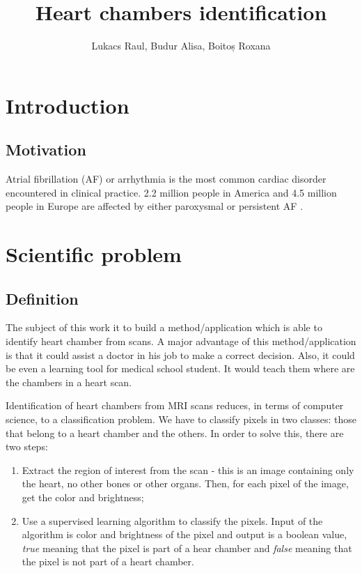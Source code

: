 \documentclass[12pt]{report}
\title{\textbf{Heart chambers identification}}
\author{Lukacs Raul, Budur Alisa, Boitoș Roxana}
\begin{document}
\maketitle
\setlength{\parindent}{1cm}

\begin{abstract}

\end{abstract}
\tableofcontents{}

\chapter{Introduction}
\section{Motivation}
Atrial fibrillation (AF) or arrhythmia is the most common cardiac disorder encountered in clinical practice. 2.2 million people in America and 4.5 million people in Europe are affected by either paroxysmal or persistent AF \cite{sankaranarayanan1}. 

\chapter{Scientific problem}
\section{Definition}
The subject of this work it to build a method/application which is able to identify heart chamber from scans. A major advantage of this method/application is that it could assist a doctor in his job to make a correct decision. Also, it could be even a learning tool for medical school student. It would teach them where are the chambers in a heart scan.

Identification of heart chambers from MRI scans reduces, in terms of computer science, to a classification problem. We have to classify pixels in two classes: those that belong to a heart chamber and the others.  In order to solve this, there are two steps:

\begin{enumerate}
	\item Extract the region of interest from the scan - this is an image containing only the heart, no other bones or other organs. Then, for each pixel of the image, get the color and brightness;
	\item  Use a supervised learning algorithm to classify the pixels. Input of the algorithm is color and brightness of the pixel and output is a boolean value, \textit{true} meaning that the pixel is part of a hear chamber and  \textit{false} meaning that the pixel is not part of a heart chamber.
\end{enumerate}
\end{document}
